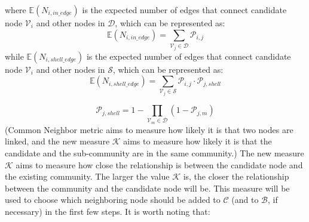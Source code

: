 \documentclass[\main/thesis.tex]{subfiles}
\begin{document}
where $\mathbb{E}(N_{i,in\_edge})$ is the expected number of edges that connect candidate node $\mathcal{V}_i$ and other nodes in $\mathcal{D}$, which can be represented as:
\begin{equation}
\mathbb{E}(N_{i,in\_edge}) = \sum_{\mathcal{V}_j\in \mathcal{D}}\mathcal{P}_{i,j}
\end{equation}
while $\mathbb{E}(N_{i,shell\_edge})$ is the expected number of edges that connect candidate node $\mathcal{V}_i$ and other nodes in $\mathcal{S}$, which can be represented as:
\begin{equation}
\mathbb{E}(N_{i,shell\_edge}) = \sum_{\mathcal{V}_j\in \mathcal{S}}\mathcal{P}_{i,j}\cdot \mathcal{P}_{j,shell}
\end{equation}

\begin{equation}
\mathcal{P}_{j,shell} = 1-\prod_{\mathcal{V}_m\in \mathcal{D}}(1-\mathcal{P}_{j,m})
\label{update-probability}
\end{equation}
(Common Neighbor metric aims to measure how likely it is that two nodes are linked, and the new measure $\mathcal{K}$ aims to measure how likely it is that the candidate and the sub-community are in the same community.)
The new measure $\mathcal{K}$ aims to measure how close the relationship is between the candidate node and the existing community. The larger the value $\mathcal{K}$ is, the closer the relationship between the community and the candidate node will be. This measure will be used to choose which neighboring node should be added to $\mathcal{C}$ (and to $\mathcal{B}$, if necessary) in the first few steps. 
It is worth noting that:
\end{document}
